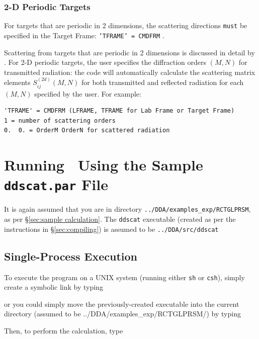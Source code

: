 \subsubsection{2-D Periodic Targets}

For targets that are periodic in 2 dimensions, 
the scattering directions {\tt must} be specified in the
Target Frame: {\tt 'TFRAME' = CMDFRM} .

Scattering from targets that are periodic in 2 dimensions
is discussed in detail by
\citet{Draine+Flatau_2008a}.
For 2-D periodic targets, the user specifies the diffraction orders 
$(M,N)$ for
transmitted radiation: the code will automatically calculate
the scattering matrix elements $S_{ij}^{(2d)}(M,N)$ for both
transmitted and reflected radiation for each $(M,N)$ specified by the user.
For example:
{\footnotesize
\begin{verbatim}
'TFRAME' = CMDFRM (LFRAME, TFRAME for Lab Frame or Target Frame)
1 = number of scattering orders
0.  0. = OrderM OrderN for scattered radiation
\end{verbatim}
}

\section{Running \ddscatv\ Using the Sample {\tt ddscat.par} File}

It is again assumed that you are in directory
{\tt ../DDA/examples\_exp/RCTGLPRSM}, as per \S\ref{sec:sample calculation}.
The {\tt ddscat} executable (created as per the instructions in
\S\ref{sec:compiling}) is assumed to be {\tt ../DDA/src/ddscat}

\subsection{ Single-Process Execution}

To execute the program on a UNIX system (running either {\tt sh} 
or {\tt csh}), simply create a symbolic link by typing

\indent{}

\noindent or you could simply move the previously-created executable into the 
current directory (assumed to be ../DDA/examples\_exp/RCTGLPRSM/) by
typing

\indent{}

\noindent Then, to perform the calculation, type

\indent{}

